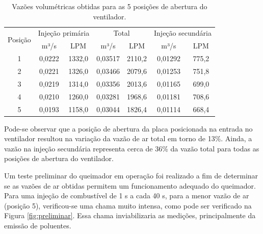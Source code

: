 \begin{table}[!ht]
	\centering
	\small
	\renewcommand{\arraystretch}{1.3}
	\caption{Vazões volumétricas obtidas para as 5 posições de abertura do ventilador.}%
	\label{tab:vazoes}
        \begin{tabular}{|c|cc|cc|cc|}
        \hline
        \multirow{2}{*}{Posição} & \multicolumn{2}{c|}{Injeção primária} & \multicolumn{2}{c|}{Total}            & \multicolumn{2}{c|}{Injeção secundária} \\ \cline{2-7} 
                         & \multicolumn{1}{c|}{m³/s}    & LPM    & \multicolumn{1}{c|}{m³/s}    & LPM    & \multicolumn{1}{c|}{m³/s}      & LPM    \\ \hline
        1                        & \multicolumn{1}{c|}{0,0222}  & 1332,0 & \multicolumn{1}{c|}{0,03517} & 2110,2 & \multicolumn{1}{c|}{0,01292}   & 775,2  \\ \hline
        2                        & \multicolumn{1}{c|}{0,0221}  & 1326,0 & \multicolumn{1}{c|}{0,03466} & 2079,6 & \multicolumn{1}{c|}{0,01253}   & 751,8  \\ \hline
        3                        & \multicolumn{1}{c|}{0,0219}  & 1314,0 & \multicolumn{1}{c|}{0,03356} & 2013,6 & \multicolumn{1}{c|}{0,01165}   & 699,0  \\ \hline
        4                        & \multicolumn{1}{c|}{0,0210}  & 1260,0 & \multicolumn{1}{c|}{0,03281} & 1968,6 & \multicolumn{1}{c|}{0,01181}   & 708,6  \\ \hline
        5                        & \multicolumn{1}{c|}{0,0193}  & 1158,0 & \multicolumn{1}{c|}{0,03044} & 1826,4 & \multicolumn{1}{c|}{0,01114}   & 668,4  \\ \hline
        \end{tabular}
	\vspace{2mm}
\end{table}

Pode-se observar que a posição de abertura da placa posicionada na entrada no ventilador resultou na variação da vazão de ar total em torno de 13\%. Ainda, a vazão na injeção secundária representa cerca de 36\% da vazão total para todas as posições de abertura do ventilador.

Um teste preliminar do queimador em operação foi realizado a fim de determinar se as vazões de ar obtidas permitem um funcionamento adequado do queimador. Para uma injeção de combustível de 1 s a cada 40 s, para a menor vazão de ar (posição 5), verificou-se uma chama muito intensa, como pode ser verificado na Figura \ref{fig:preliminar}. Essa chama inviabilizaria as medições, principalmente da emissão de poluentes.

